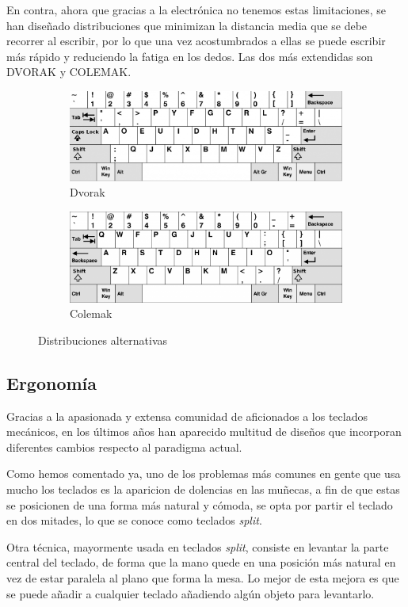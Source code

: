   En contra, ahora que gracias a la electrónica no tenemos estas limitaciones, se han diseñado distribuciones que minimizan la distancia media que se debe recorrer al escribir, por lo que una vez acostumbrados a ellas se puede escribir más rápido y reduciendo la fatiga en los dedos. Las dos más extendidas son DVORAK y COLEMAK. 
  \begin{figure}[H]
    \begin{subfigure}[b]{.5\textwidth}
      \centering
      \includegraphics[width=.6\textwidth]{images/dvorak}
      \caption{Dvorak}
    \end{subfigure} 
    \hfill
    \begin{subfigure}[b]{.5\textwidth}
      \centering
      \includegraphics[width=.6\textwidth]{images/colemak}
      \caption{Colemak}
    \end{subfigure}
    \caption{Distribuciones alternativas}
  \end{figure}

\subsection{Ergonomía}
Gracias a la apasionada y extensa comunidad de aficionados a los teclados mecánicos, en los últimos años han aparecido multitud de diseños que incorporan diferentes cambios respecto al paradigma actual.\newline

Como hemos comentado ya, uno de los problemas más comunes en gente que usa mucho los teclados es la aparicion de dolencias en las muñecas, a fin de que estas se posicionen de una forma más natural y cómoda, se opta por partir el teclado en dos mitades, lo que se conoce como teclados \textit{split}.

Otra técnica, mayormente usada en teclados \textit{split}, consiste en levantar la parte central del teclado, de forma que la mano quede en una posición más natural en vez de estar paralela al plano que forma la mesa. Lo mejor de esta mejora es que se puede añadir a cualquier teclado añadiendo algún objeto para levantarlo.

